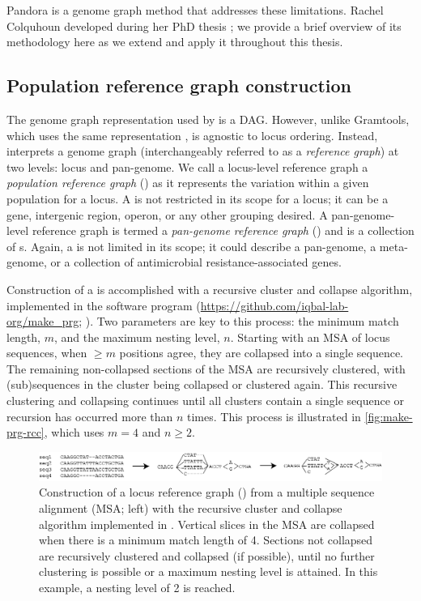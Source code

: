 Pandora is a genome graph method that addresses these limitations. Rachel Colquhoun developed \pandora{} during her PhD thesis \cite{rachelthesis}; we provide a brief overview of its methodology here as we extend and apply it throughout this thesis.

\subsection{Population reference graph construction}
\label{sec:make_prg}

The genome graph representation used by \pandora{} is a DAG. However, unlike Gramtools, which uses the same representation \cite{gramtools2021}, \pandora{} is agnostic to locus ordering. Instead, \pandora{} interprets a genome graph (interchangeably referred to as a \emph{reference graph}) at two levels: locus and pan-genome. We call a locus-level reference graph a \emph{population reference graph} (\prg{}) as it represents the variation within a given population for a locus. A \prg{} is not restricted in its scope for a locus; it can be a gene, intergenic region, operon, or any other grouping desired. A pan-genome-level reference graph is termed a \emph{pan-genome reference graph} (\panrg{}) and is a collection of \prg{}s. Again, a \panrg{} is not limited in its scope; it could describe a pan-genome, a meta-genome, or a collection of antimicrobial resistance-associated genes.

Construction of a \prg{} is accomplished with a recursive cluster and collapse algorithm, implemented in the software program \makeprg{} (\url{https://github.com/iqbal-lab-org/make_prg}; \cite{rachelthesis,pandora}). Two parameters are key to this process: the minimum match length, $m$, and the maximum nesting level, $n$. Starting with an MSA of locus sequences, when $\ge m$ positions agree, they are collapsed into a single sequence. The remaining non-collapsed sections of the MSA are recursively clustered, with (sub)sequences in the cluster being collapsed or clustered again. This recursive clustering and collapsing continues until all clusters contain a single sequence or recursion has occurred more than $n$ times. This process is illustrated in \autoref{fig:make-prg-rcc}, which uses $m=4$ and $n\ge 2$.

\begin{figure}
\centering
\includegraphics[width=1\columnwidth]{Chapter0/Figs/make-prg.png}
\caption{Construction of a locus reference graph (\prg{}) from a multiple sequence alignment (MSA; left) with the recursive cluster and collapse algorithm implemented in \makeprg{}. Vertical slices in the MSA are collapsed when there is a minimum match length of 4. Sections not collapsed are recursively clustered and collapsed (if possible), until no further clustering is possible or a maximum nesting level is attained. In this example, a nesting level of 2 is reached.}
\label{fig:make-prg-rcc}
\end{figure}

